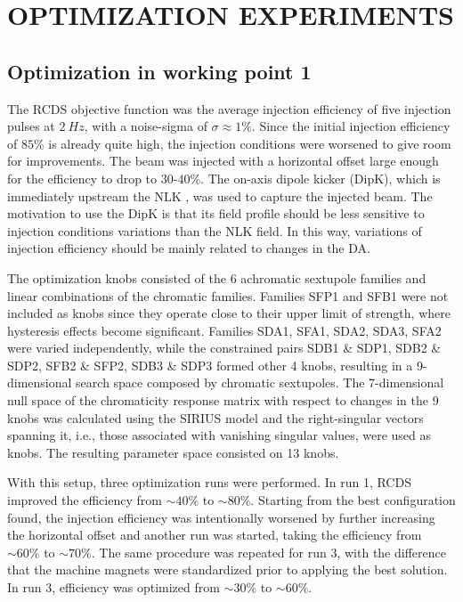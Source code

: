 \documentclass[a4paper,
               keeplastbox,   %
               ]{jacow}
\begin{document}
\section{OPTIMIZATION EXPERIMENTS}

\subsection{Optimization in  working point 1}
The RCDS objective function was the average injection efficiency of five injection pulses at $2~\unit{Hz}$, with a noise-sigma of $\sigma \approx 1\%$. Since the initial injection efficiency of $85\%$ is already quite high, the injection conditions were worsened to give room for improvements. The beam was injected with a horizontal offset large enough for the efficiency to drop to $30$-$40\%$. The on-axis dipole kicker (DipK), which is immediately upstream the NLK \cite{Liu:IPAC2016-THPMR011}, was used to capture the injected beam. The motivation to use the DipK is that its field profile should be less sensitive to injection conditions variations than the NLK field. In this way, variations of injection efficiency should be mainly related to changes in the DA.

The optimization knobs consisted of the 6 achromatic sextupole families and linear combinations of the chromatic families. Families SFP1 and SFB1 were not included as knobs since they operate close to their upper limit of strength, where hysteresis effects become significant.  Families SDA1, SFA1, SDA2, SDA3, SFA2 were varied independently, while the constrained pairs SDB1 \& SDP1, SDB2 \& SDP2, SFB2 \& SFP2, SDB3 \& SDP3 formed other 4 knobs, resulting in a 9-dimensional search space composed by chromatic sextupoles. The 7-dimensional null space of the chromaticity response matrix with respect to changes in the 9 knobs was calculated using the SIRIUS model and the right-singular vectors spanning it, i.e., those associated with vanishing singular values, were used as knobs. The resulting parameter space consisted on 13 knobs. 

With this setup, three optimization runs were performed. In run 1, RCDS improved the efficiency from $\sim40\%$ to $\sim80\%$. Starting from the best configuration found, the injection efficiency was intentionally worsened by further increasing the horizontal offset and another run was started, taking the efficiency from $\sim60\%$ to $\sim70\%$. The same procedure was repeated for run 3, with the difference that the machine magnets were standardized prior to applying the best solution. In run 3, efficiency was optimized from $\sim30\%$ to $\sim60\%$.
 
\end{document}
